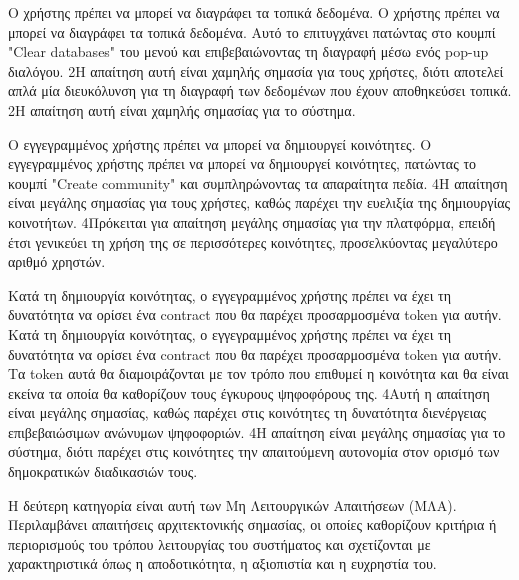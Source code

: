 \begin{enumerate}[label=\textbf{<ΛΑ-\arabic*>}, leftmargin=\parindent, align=left, labelwidth=\parindent, labelsep=0pt]
	\newpage
	\sysReqItem
		{\label{srs:functional-srs-delete-local-data}}
		{Ο χρήστης πρέπει να μπορεί να διαγράφει τα τοπικά δεδομένα.}
		{Ο χρήστης πρέπει να μπορεί να διαγράφει τα τοπικά δεδομένα. Αυτό το επιτυγχάνει πατώντας στο κουμπί "Clear databases" του μενού και επιβεβαιώνοντας τη διαγραφή μέσω ενός pop-up διαλόγου.}
		{2}{Η απαίτηση αυτή είναι χαμηλής σημασία για τους χρήστες, διότι αποτελεί απλά μία διευκόλυνση για τη διαγραφή των δεδομένων που έχουν αποθηκεύσει τοπικά.}
		{2}{Η απαίτηση αυτή είναι χαμηλής σημασίας για το σύστημα.}

	\sysReqItem
		{\label{srs:functional-srs-create-communities}}
		{Ο εγγεγραμμένος χρήστης πρέπει να μπορεί να δημιουργεί κοινότητες.}
		{Ο εγγεγραμμένος χρήστης πρέπει να μπορεί να δημιουργεί κοινότητες, πατώντας το κουμπί "Create community" και συμπληρώνοντας τα απαραίτητα πεδία.}
		{4}{Η απαίτηση είναι μεγάλης σημασίας για τους χρήστες, καθώς παρέχει την ευελιξία της δημιουργίας κοινοτήτων.}
		{4}{Πρόκειται για απαίτηση μεγάλης σημασίας για την πλατφόρμα, επειδή έτσι γενικεύει τη χρήση της σε περισσότερες κοινότητες, προσελκύοντας μεγαλύτερο αριθμό χρηστών.}

	\sysReqItem
		{\label{srs:functional-srs-assign-community-contract}}
		{Κατά τη δημιουργία κοινότητας, ο εγγεγραμμένος χρήστης πρέπει να έχει τη δυνατότητα να ορίσει ένα contract που θα παρέχει προσαρμοσμένα token για αυτήν.}
		{Κατά τη δημιουργία κοινότητας, ο εγγεγραμμένος χρήστης πρέπει να έχει τη δυνατότητα να ορίσει ένα contract που θα παρέχει προσαρμοσμένα token για αυτήν. Τα token αυτά θα διαμοιράζονται με τον τρόπο που επιθυμεί η κοινότητα και θα είναι εκείνα τα οποία θα καθορίζουν τους έγκυρους ψηφοφόρους της.}
		{4}{Αυτή η απαίτηση είναι μεγάλης σημασίας, καθώς παρέχει στις κοινότητες τη δυνατότητα διενέργειας επιβεβαιώσιμων ανώνυμων ψηφοφοριών.}
		{4}{Η απαίτηση είναι μεγάλης σημασίας για το σύστημα, διότι παρέχει στις κοινότητες την απαιτούμενη αυτονομία στον ορισμό των δημοκρατικών διαδικασιών τους.}
\end{enumerate}

Η δεύτερη κατηγορία είναι αυτή των Μη Λειτουργικών Απαιτήσεων (ΜΛΑ). Περιλαμβάνει απαιτήσεις αρχιτεκτονικής σημασίας, οι οποίες καθορίζουν κριτήρια ή περιορισμούς του τρόπου λειτουργίας του συστήματος και σχετίζονται με χαρακτηριστικά όπως η αποδοτικότητα, η αξιοπιστία και η ευχρηστία του.

